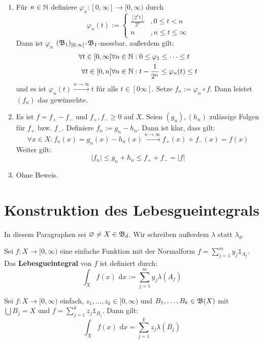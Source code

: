 \documentclass[a4paper,twoside,DIV15,BCOR12mm,chapterprefix=true,headings=onelinechapter]{scrbook}
\begin{document}
\begin{beweis}
\begin{enumerate}
\item Für $n\in\mathbb{N}$ definiere $\varphi_n:[0,\infty]\to[0,\infty)$ durch
\[\varphi_n(t):=\begin{cases}\frac{[2^nt]}{2^n} &,0\le t<n\\ n &,n\le t\le\infty\end{cases}\]
Dann ist $\varphi_n$ $(\mathfrak{B}_1)_{[0,\infty]}$-$\mathfrak{B}_1$-messbar, außerdem gilt:
\begin{align*}
\forall t\in[0,\infty]\forall n\in\mathbb{N}&: 0\le\varphi_1\le\cdots\le t\\
\forall t\in[0,n]\forall n\in\mathbb{N}&: t-\frac1{2^n}\le\varphi_n(t)\le t 
\end{align*}
und es ist $\varphi_n(t)\stackrel{n\to\infty}\to t$ für alle $t\in[0\infty]$. Setze $f_n:=\varphi_n\circ f$. Dann leistet $(f_n)$ das gewünschte.
\item Es ist $f=f_+-f_-$ und $f_+,f_-\ge0$ auf $X$. Seien $(g_n),(h_n)$ zulässige Folgen für $f_+$ bzw. $f_-$. Definiere $f_n:=g_n-h_n$. Dann ist klar, dass gilt:
\[\forall x\in X: f_n(x)=g_n(x)-h_n(x)\stackrel{n\to\infty}\to f_+(x)+f_-(x)=f(x)\]
Weiter gilt:
\[|f_n|\le g_n+h_n\le f_++f_-=|f|\]
\item Ohne Beweis. 
\end{enumerate}
\end{beweis}

\chapter{Konstruktion des Lebesgueintegrals}

In diesem Paragraphen sei $\varnothing\ne X\in\mathfrak{B}_d$. Wir schreiben außerdem $\lambda$ statt $\lambda_d$.

\begin{definition}
Sei $f:X\to [0,\infty)$ eine einfache Funktion mit der Normalform $f=\sum_{j=1}^m y_j\mathds{1}_{A_j}$.\\
Das \textbf{Lebesgueintegral} von $f$ ist definiert durch:
\[\int_X f(x)\text{ d}x:=\sum_{j=1}^m y_j\lambda(A_j)\]
\end{definition}

\begin{satz}
\label{Satz 4.1}
Sei $f:X\to[0,\infty)$ einfach, $z_1,\ldots,z_k\in[0,\infty)$ und $B_1,\ldots,B_k\in\mathfrak{B}(X)$ mit $\bigcup B_j=X$ und $f=\sum_{j=1}^k z_j\mathds{1}_{B_j}$. Dann gilt:
\[\int_X f(x)\text{ d}x=\sum_{j=1}^k z_j\lambda(B_j)\]
\end{satz}
\end{document}
